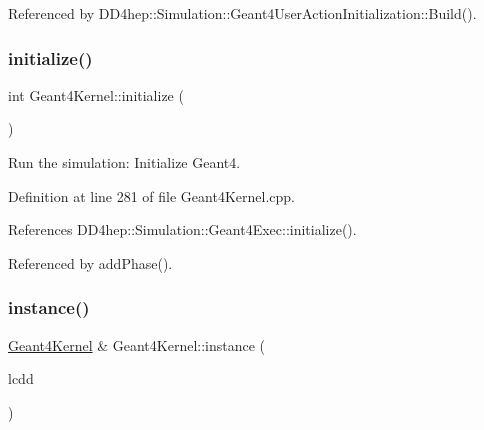 Referenced by D\+D4hep\+::\+Simulation\+::\+Geant4\+User\+Action\+Initialization\+::\+Build().

\hypertarget{class_d_d4hep_1_1_simulation_1_1_geant4_kernel_add7a520dbd9824819e75cf9ea3725882}{}\label{class_d_d4hep_1_1_simulation_1_1_geant4_kernel_add7a520dbd9824819e75cf9ea3725882} 
\subsubsection{\texorpdfstring{initialize()}{initialize()}}
{\footnotesize\ttfamily int Geant4\+Kernel\+::initialize (\begin{DoxyParamCaption}{ }\end{DoxyParamCaption})\hspace{0.3cm}{\ttfamily [virtual]}}



Run the simulation\+: Initialize Geant4. 



Definition at line 281 of file Geant4\+Kernel.\+cpp.



References D\+D4hep\+::\+Simulation\+::\+Geant4\+Exec\+::initialize().



Referenced by add\+Phase().

\hypertarget{class_d_d4hep_1_1_simulation_1_1_geant4_kernel_a791f6c4b8f9257f98d453457655870de}{}\label{class_d_d4hep_1_1_simulation_1_1_geant4_kernel_a791f6c4b8f9257f98d453457655870de} 
\subsubsection{\texorpdfstring{instance()}{instance()}}
{\footnotesize\ttfamily \hyperlink{class_d_d4hep_1_1_simulation_1_1_geant4_kernel}{Geant4\+Kernel} \& Geant4\+Kernel\+::instance (\begin{DoxyParamCaption}\item[{\hyperlink{class_d_d4hep_1_1_simulation_1_1_geant4_kernel_a190e652b62ebce3db3372c4265ffa5a3}{L\+C\+DD} \&}]{lcdd }\end{DoxyParamCaption})\hspace{0.3cm}{\ttfamily [static]}}



